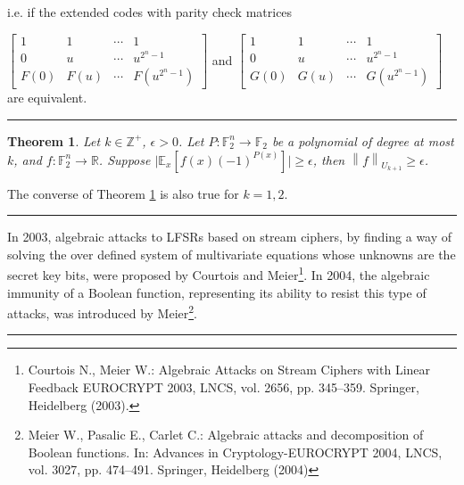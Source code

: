 \documentclass[8pt,oneside]{article}
\newcommand{\0}{\textbf{0}}
\newcommand{\1}{\textbf{1}}
\newcommand{\Z}{\mathbb{Z}}
\newcommand{\F}{\mathbb{F}}
\newcommand{\R}{\mathbb{R}}
\newtheorem{theorem}{Theorem}
\begin{document}
    i.e. if the extended codes with parity check matrices

    $ \begin{bmatrix}
        1 & 1 &\cdots &1\\
        0& u& \cdots &u^{2^n-1}\\
        F(0)& F(u)& \cdots &F(u^{2^n-1})
    \end{bmatrix} $ 
    and 
    $\begin{bmatrix}
        1 & 1 &\cdots &1\\
        0& u& \cdots &u^{2^n-1}\\
        G(0)& G(u)& \cdots &G(u^{2^n-1})
    \end{bmatrix}$
    are equivalent.


    \noindent\rule{\linewidth}{0.4pt}

    \begin{theorem}\label{gowers}
        Let $ k\in\Z^+ $, $ \epsilon>0 $. Let $ P:\F_2^n\rightarrow\F_2 $ be a polynomial of degree
        at most $ k $, and $ f:\F_2^n\rightarrow\R $. Suppose $ \lvert \mathbb{E}_x\left[f(x)(-1)^{P(x)}\right]\rvert\geq\epsilon  $, then $ \left\lVert f\right\rVert _{U_{k+1}}\geq\epsilon $.
    \end{theorem}
    The converse of Theorem \ref{gowers} is also true for $k = 1, 2$.



    
    \noindent\rule{\linewidth}{0.4pt}

    In 2003, algebraic attacks to LFSRs based on stream ciphers, by finding a way of solving 
    the over defined system of multivariate equations whose unknowns are the secret key bits,
    were proposed by Courtois and Meier\footnote{Courtois N., Meier W.: Algebraic Attacks on Stream Ciphers with Linear Feedback EUROCRYPT 2003,
    LNCS, vol. 2656, pp. 345–359. Springer, Heidelberg (2003).}. In 2004, the algebraic immunity of a Boolean
    function, representing its ability to resist this type of attacks, was introduced by Meier\footnote{Meier W., Pasalic E., Carlet C.: Algebraic attacks and decomposition of Boolean functions. In: Advances
    in Cryptology-EUROCRYPT 2004, LNCS, vol. 3027, pp. 474–491. Springer, Heidelberg (2004)}.

    \noindent\rule{\linewidth}{0.4pt}
\end{document}
